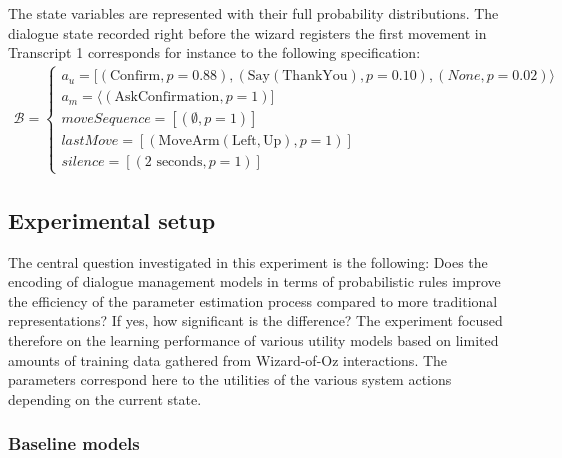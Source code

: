 The state variables are represented with their full probability distributions. The dialogue state recorded right before the wizard registers the first movement in Transcript 1 corresponds for instance to the following specification: 
\begin{align*}
\mathcal{B} = \begin{cases} a_u = [ (\mathrm{Confirm}, p\!=\!0.88), (\mathrm{Say(ThankYou)}, p\!=\!0.10), (\mathit{None}, p\!=\!0.02) \rangle \\
a_m = \langle (\mathrm{AskConfirmation}, p\!=\!1) ] \\
\mathit{moveSequence} = [ ( \emptyset, p\!=\!1) ] \\
\mathit{lastMove} = [ (\mathrm{MoveArm(Left,Up)}, p\!=\!1) ] \\
\mathit{silence} = [ (2 \textrm{ seconds}, p\!=\!1) ] \end{cases}
\end{align*}

\subsection{Experimental setup}
\label{sec:wozlearning-experiments-setup}

The central question investigated in this experiment is the following: Does the encoding of dialogue management models in terms of probabilistic rules improve the efficiency of the parameter estimation process compared to more traditional representations? If yes, how significant is the difference? The experiment focused therefore on the learning performance of various utility models based on limited amounts of training data gathered from Wizard-of-Oz interactions. The parameters correspond here to the utilities of the various system actions depending on the current state.

\subsubsection*{Baseline models}

